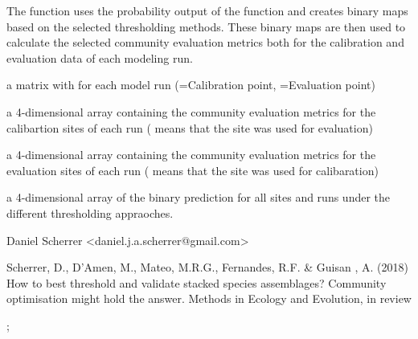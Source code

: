 \documentclass[a4paper]{book}
\begin{document}
%
\begin{Details}\relax
The function uses the probability output of the  function and creates binary maps based on the selected thresholding methods. These binary maps are then used to calculate the selected community evaluation metrics both for the calibration and evaluation data of each modeling run.
\end{Details}
%
\begin{Value}
\begin{ldescription}
\item[\code{DataSplitTable}] a matrix with  for each model run (=Calibration point, =Evaluation point)
\item[\code{CommunityEvaluationMetrics.CalibrationSites}] a 4-dimensional array containing the community evaluation metrics for the calibartion sites of each run ( means that the site was used for evaluation)
\item[\code{CommunityEvaluationMetrics.EvaluationSites}] a 4-dimensional array containing the community evaluation metrics for the evaluation sites of each run ( means that the site was used for calibaration)
\item[\code{PA.allSites}] a 4-dimensional array of the binary prediction for all sites and runs under the different thresholding appraoches.
\end{ldescription}
\end{Value}
%
\begin{Author}\relax
Daniel Scherrer <daniel.j.a.scherrer@gmail.com>
\end{Author}
%
\begin{References}\relax
Scherrer, D., D'Amen, M., Mateo, M.R.G., Fernandes, R.F. \& Guisan , A. (2018) How to best threshold and validate stacked species assemblages? Community optimisation might hold the answer. Methods in Ecology and Evolution, in review
\end{References}
%
\begin{SeeAlso}\relax
{}; 
\end{SeeAlso}
%
\end{document}
